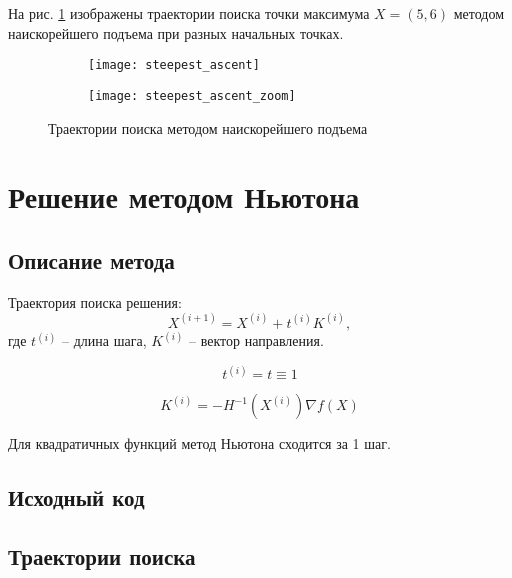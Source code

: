 \vspace{-0.5cm}

На рис. \ref{fig:steepest_ascent} изображены траектории поиска точки максимума $X = (5, 6)$ методом наискорейшего подъема при разных начальных точках.
\vspace{-0.5cm}
\begin{figure}[H]
\begin{center}
	\begin{subfigure}[b]{0.49\textwidth}
		\texttt{[image: steepest\_ascent]}
	\end{subfigure}
	\begin{subfigure}[b]{0.49\textwidth}
		\texttt{[image: steepest\_ascent\_zoom]}
	\end{subfigure}
	\caption{Траектории поиска методом наискорейшего подъема}
	\label{fig:steepest_ascent}
\end{center}
\end{figure}

\section{Решение методом Ньютона}

\subsection{Описание метода}

Траектория поиска решения:
\begin{equation*}
X^{(i+1)}  = X^{(i)} + t^{(i)} K^{(i)},
\end{equation*}
где $t^{(i)}$ -- длина шага, $K^{(i)}$ -- вектор направления.

\begin{equation*}
t^{(i)} = t \equiv 1
\end{equation*}

\begin{equation*}
K^{(i)} = -H^{-1}\left(X^{(i)}\right) \nabla f(X)
\end{equation*}

Для квадратичных функций метод Ньютона сходится за 1 шаг.

\subsection{Исходный код}



\subsection{Траектории поиска}

